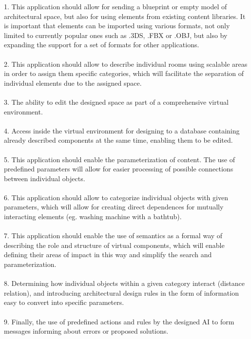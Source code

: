 \documentclass[runningheads]{llncs}
\begin{document}
\begin{addmargin}[1em]{2em}%
1.	This application should allow for sending a blueprint or empty model of architectural space, but also for using elements from existing content libraries. It is important that elements can be imported using various formats, not only limited to currently popular ones such as .3DS, .FBX or .OBJ, but also by expanding the support for a set of formats for other applications.\\
\\
2.	This application should allow to describe individual rooms using scalable areas in order to assign them specific categories, which will facilitate the separation of individual elements due to the assigned space.\\
\\
3.	The ability to edit the designed space as part of a comprehensive virtual environment.\\
\\
4.	Access inside the virtual environment for designing to a database containing already described components at the same time, enabling them to be edited.\\
\\
5.	This application should enable the parameterization of content. The use of predefined parameters will allow for easier processing of possible connections between individual objects.\\
\\
6.	This application should allow to categorize individual objects with given parameters, which will allow for creating direct dependences for mutually interacting elements (eg. washing machine with a bathtub).\\
\\
7.	This application should enable the use of semantics as a formal way of describing the role and structure of virtual components, which will enable defining their areas of impact in this way and simplify the search and parameterization.\\
\\
8.	Determining how individual objects within a given category interact (distance relation), and introducing architectural design rules in the form of information easy to convert into specific parameters.\\
\\
9.  	Finally, the use of predefined actions and rules by the designed AI to form messages informing about errors or proposed solutions.\\
\end{addmargin}
\end{document}
